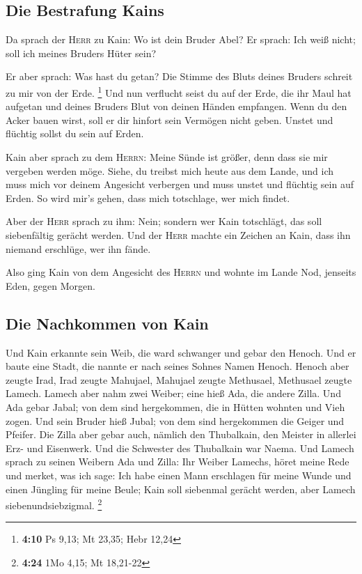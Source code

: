 \hypertarget{die-bestrafung-kains}{%
\subsection{Die Bestrafung Kains}\label{die-bestrafung-kains}}

 Da sprach der \textsc{Herr} zu Kain: Wo ist dein Bruder
Abel? Er sprach: Ich weiß nicht; soll ich meines Bruders Hüter sein?

 Er aber sprach: Was hast du getan? Die Stimme des Bluts
deines Bruders schreit zu mir von der Erde. \footnote{\textbf{4:10} Ps
  9,13; Mt 23,35; Hebr 12,24}  Und nun verflucht seist du
auf der Erde, die ihr Maul hat aufgetan und deines Bruders Blut von
deinen Händen empfangen.  Wenn du den Acker bauen wirst,
soll er dir hinfort sein Vermögen nicht geben. Unstet und flüchtig
sollst du sein auf Erden.

 Kain aber sprach zu dem \textsc{Herrn}: Meine Sünde ist
größer, denn dass sie mir vergeben werden möge.  Siehe,
du treibst mich heute aus dem Lande, und ich muss mich vor deinem
Angesicht verbergen und muss unstet und flüchtig sein auf Erden. So wird
mir's gehen, dass mich totschlage, wer mich findet.

 Aber der \textsc{Herr} sprach zu ihm: Nein; sondern wer
Kain totschlägt, das soll siebenfältig gerächt werden. Und der
\textsc{Herr} machte ein Zeichen an Kain, dass ihn niemand erschlüge,
wer ihn fände.

 Also ging Kain von dem Angesicht des \textsc{Herrn} und
wohnte im Lande Nod, jenseits Eden, gegen Morgen.

\hypertarget{die-nachkommen-von-kain}{%
\subsection{Die Nachkommen von Kain}\label{die-nachkommen-von-kain}}

 Und Kain erkannte sein Weib, die ward schwanger und
gebar den Henoch. Und er baute eine Stadt, die nannte er nach seines
Sohnes Namen Henoch.  Henoch aber zeugte Irad, Irad
zeugte Mahujael, Mahujael zeugte Methusael, Methusael zeugte Lamech.
 Lamech aber nahm zwei Weiber; eine hieß Ada, die andere
Zilla.  Und Ada gebar Jabal; von dem sind hergekommen,
die in Hütten wohnten und Vieh zogen.  Und sein Bruder
hieß Jubal; von dem sind hergekommen die Geiger und Pfeifer.
 Die Zilla aber gebar auch, nämlich den Thubalkain, den
Meister in allerlei Erz- und Eisenwerk. Und die Schwester des Thubalkain
war Naema.  Und Lamech sprach zu seinen Weibern Ada und
Zilla: Ihr Weiber Lamechs, höret meine Rede und merket, was ich sage:
Ich habe einen Mann erschlagen für meine Wunde und einen Jüngling für
meine Beule;  Kain soll siebenmal gerächt werden, aber
Lamech siebenundsiebzigmal. \footnote{\textbf{4:24} 1Mo 4,15; Mt
  18,21-22}

